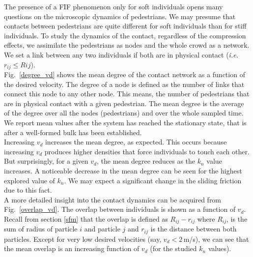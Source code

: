 \documentclass[preprint,12pt]{elsarticle}
\begin{document}
The presence of a FIF phenomenon only for soft individuals opens many questions 
on the microscopic dynamics of pedestrians. We may presume that contacts 
between pedestrians are quite different for soft individuals than for stiff 
individuals. To study the dynamics of the contact, regardless of the compression 
effects, we assimilate the pedestrians as nodes and the whole crowd as a 
network. We set a link between any two individuals if both are in physical 
contact (\textit{i.e.} $r_{ij} \leq R{ij}$).\\

Fig.~\ref{degree_vd} shows the mean degree of the contact network as a function  
of the desired velocity. The degree of a node is defined as the number of links 
that connect this node to any other node. This means, the number of pedestrians 
that are in physical contact with a given pedestrian. The mean degree is the 
average of the degree over all the nodes (pedestrians) and over the whole 
sampled time. We report mean values after the system has reached the stationary 
state, that is after a well-formed bulk has been established.\\

Increasing $v_d$ increases the mean degree, as expected. This occurs because 
increasing $v_d$ produces higher densities that force individuals to touch each 
other. But surprisingly, for a given $v_d$, the mean degree reduces as the $k_n$ 
value increases. A noticeable decrease in the mean degree can be seen for the 
highest explored value of $k_n$. We may expect a significant change in the 
sliding friction due to this fact.\\

A more detailed insight into the contact dynamics can be acquired from 
Fig.~\ref{overlap_vd}. The overlap between individuals is shown as a function of 
$v_d$. Recall from section \ref{sfm} that the overlap is defined as 
$R_{ij}-r_{ij}$ where $R_{ij}$, is the sum of radius of particle $i$ and 
particle $j$ and $r_{ij}$  is the distance between both particles. Except for 
very low desired velocities (say, $v_d<2\,$m/s), we can see that the mean 
overlap is an increasing function of $v_d$ (for the studied $k_n$ values).\\

\end{document}
